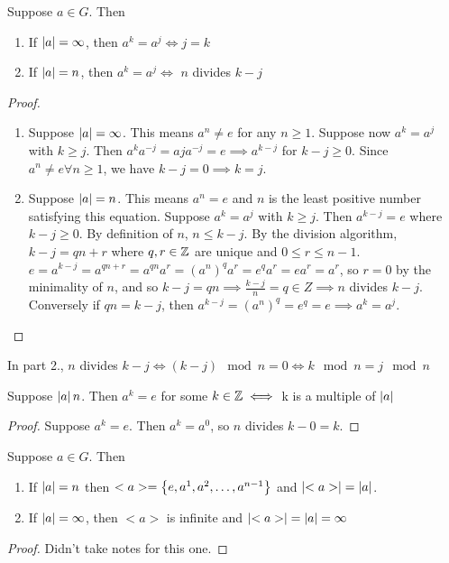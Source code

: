 \begin{theorem}
    Suppose $a \in G$. Then 
    \begin{enumerate}
        \item If $\left| a \right| = \infty$, then $a^k = a^j \iff j = k$
        \item If $\left| a \right| = n$, then $a^k = a^j \iff$ $n$ divides $k - j$
    \end{enumerate}
\end{theorem}
\begin{proof}
    \begin{enumerate}
        \item Suppose $\left| a \right| = \infty$. This means $a^n \neq e$ for any $n \geq 1$. Suppose now $a^k = a^j$ with $k \geq j$. Then $a^ka^{-j} = aja^{-j} = e \implies a^{k-j}$ for $k - j \geq 0$. Since $a^n \neq e \forall n \geq 1$, we have $k - j = 0 \implies k = j$.
        \item Suppose $\left| a \right| = n$. This means $a^n = e$ and $n$ is the least positive number satisfying this equation. Suppose $a^k = a^j$ with $k \geq j$. Then $a^{k-j} = e$ where $k - j \geq 0$. By definition of $n$, $n \leq k - j$. By the division algorithm, $k - j = qn + r$ where $q, r \in \mathbb{Z}$ are unique and $0 \leq r \leq n - 1$. \\
        $e = a^{k - j} = a^{qn + r} = a^{qn} a^r = \left(a^n\right)^q a^r = e^q a^r = ea^r =a^r$, so $r = 0$ by the minimality of $n$, and so $k - j = qn \implies \frac{k-j}{n} = q \in Z \implies n$ divides $k - j$.\\
        Conversely if $qn = k - j$, then $a^{k-j} = \left(a^n\right)^q = e^q = e \implies a^k = a^j$.
    \end{enumerate}
\end{proof}

\begin{remark}
    In part 2., $n$ divides $k-j \iff (k-j) \mod n = 0 \iff k \mod n = j \mod n$
\end{remark}

\begin{corollary}
    Suppose $\left| a \right| n$. Then $a^k = e$ for some $k \in \mathbb{Z} \iff$ k is a multiple of $\left| a \right|$
\end{corollary}
\begin{proof}
    Suppose $a^k = e$. Then $a^k = a^0$, so $n$ divides $k - 0 = k$.
\end{proof}

\begin{corollary}
    Suppose $a \in G$. Then \begin{enumerate}
        \item If $\left|a\right| = n$ then $<a> = \left\{e, a^1, a^2, \dots, a^{n-1}\right\}$ and $\left|<a>\right| = \left|a\right|$.
        \item If $\left|a\right| = \infty$, then $<a>$ is infinite and $\left|<a>\right| = \left|a\right| = \infty$
    \end{enumerate}
\end{corollary}
\begin{proof}
    Didn't take notes for this one.
\end{proof}

